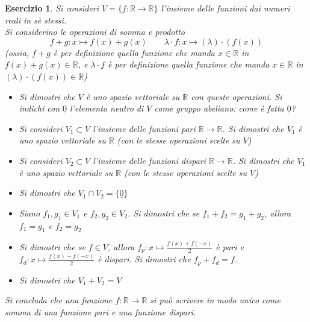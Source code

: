 \documentclass{article}
\newtheorem{es}{Esercizio}
\begin{document}
{\begin{es}
    Si consideri $V=\{f:\mathbb{R}\to \mathbb{R}\}$ l'insieme delle funzioni dai numeri reali in sè stessi.\\
    Si considerino le operazioni di somma e prodotto
    $$f+g:x\mapsto f(x)+g(x)\qquad \lambda\cdot f:x\mapsto (\lambda)\cdot( f(x))$$
    (ossia, $f+g$ è per definizione quella funzione che manda $x\in\mathbb{R}$ in $f(x)+g(x)\in\mathbb{R}$, e $\lambda \cdot f$ è per definizione quella funzione che manda $x\in\mathbb{R}$ in $(\lambda )\cdot(f(x))\in\mathbb{R}$)\\
    \begin{itemize}
        \item Si dimostri che $V$ è uno spazio vettoriale su $\mathbb{R}$ con queste operazioni. Si indichi con $\underline{0}$ l'elemento neutro di $V$ come gruppo abeliano: come è fatta $\underline{0}$?
        \item Si consideri $V_1\subset V$ l'insieme delle funzioni pari $\mathbb{R}\to \mathbb{R}$. Si dimostri che $V_1$ è uno spazio vettoriale su $\mathbb{R}$ (con le stesse operazioni scelte su $V$)
        \item Si consideri $V_2\subset V$ l'insieme delle funzioni dispari $\mathbb{R}\to \mathbb{R}$. Si dimostri che $V_1$ è uno spazio vettoriale su $\mathbb{R}$ (con le stesse operazioni scelte su $V$)
        \item Si dimostri che $V_1\cap V_2=\{\underline{0}\}$
        \item Siano $f_1,g_1\in V_1$ e $f_2,g_2\in V_2$. Si dimostri che se $f_1+f_2=g_1+g_2$, allora $f_1=g_1$ e $f_2=g_2$
        \item Si dimostri che se $f\in V$, allora $f_p:x\mapsto \frac{f(x)+f(-x)}{2}$ è pari e $f_d:x\mapsto \frac{f(x)-f(-x)}{2}$ è dispari. Si dimostri che $f_p+f_d=f$.
        \item Si dimostri che $V_1+V_2=V$
    \end{itemize}
    Si concluda che una funzione $f:\mathbb{R}\to \mathbb{R}$ si può scrivere in modo unico come somma di una funzione pari e una funzione dispari.
\end{es}



}
\end{document}
